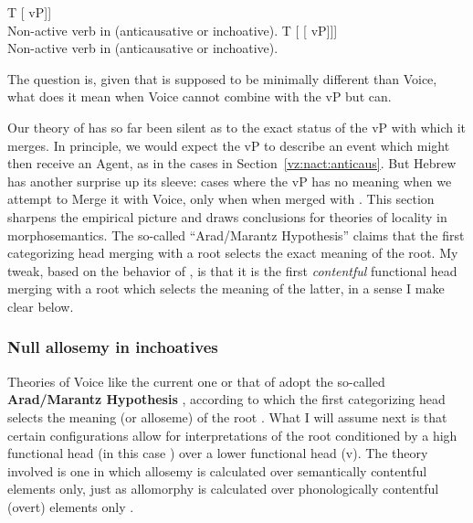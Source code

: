 
\pex
	\a {[}T [{\vz} vP]]\\
	Non-active verb in {\tnif} (anticausative or inchoative).
	\a {[}T [{\vz} [{\va} vP]]]\\
	Non-active verb in {\thit} (anticausative or inchoative).
\xe

The question is, given that {\vz} is supposed to be minimally different than Voice, what does it mean when Voice cannot combine with the vP but {\vz} can.


Our theory of {\vz} has so far been silent as to the exact status of the vP with which it merges. In principle, we would expect the vP to describe an event which might then receive an Agent, as in the cases in Section~\ref{vz:nact:anticaus}. But Hebrew has another surprise up its sleeve: cases where the vP has no meaning when we attempt to Merge it with Voice, only when when merged with {\vz}. This section sharpens the empirical picture and draws conclusions for theories of locality in morphosemantics. The so-called ``Arad/Marantz Hypothesis'' claims that the first categorizing head merging with a root selects the exact meaning of the root. My tweak, based on the behavior of {\vz}, is that it is the first \emph{contentful} functional head merging with a root which selects the meaning of the latter, in a sense I make clear below.


  		\subsubsection{Null allosemy in inchoatives} \label{vz:inch:analysis}
Theories of Voice like the current one or that of \cite{layering15} adopt the so-called \textbf{Arad/Marantz Hypothesis} \citep{elenasamioti14}, according to which the first categorizing head selects the meaning (or alloseme) of the root \citep{arad03,marantz13}. What I will assume next is that certain configurations allow for interpretations of the root conditioned by a high functional head (in this case {\vz}) over a lower functional head (v). The theory involved is one in which allosemy is calculated over semantically contentful elements only, just as allomorphy is calculated over phonologically contentful (overt) elements only \citep{marantz13,kastner18nllt}.

